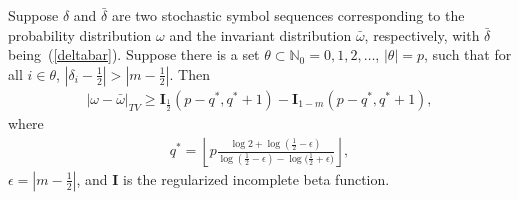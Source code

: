 \documentclass[final]{siamltex}
\begin{document}
\begin{theorem}
  \label{theoremlb} Suppose $\delta$ and $\bar{\delta}$ are two
  stochastic symbol sequences corresponding to the probability
  distribution $\omega$ and the invariant distribution $\bar{\omega}$,
  respectively, with $\bar{\delta}$ being~(\ref{deltabar}). Suppose
  there is a set $\theta \subset \mathbb{N}_0 = {0,1,2,\ldots}$,
  $|\theta|=p$, such that for all $i \in \theta$,
  $|\delta_i-\frac{1}{2}|>|m-\frac{1}{2}|$. Then
  \begin{align}
    \label{lbineq}
    |\omega-\bar{\omega}|_{TV} \ge
    \mathbf{I}_{\frac{1}{2}}(p-q^*,q^*+1) -
    \mathbf{I}_{1-m}(p-q^*,q^*+1),
  \end{align}
  where
  \begin{align}
    \label{kstar}
    q^* = \left\lfloor p \frac{\log{2}+\log{(\frac{1}{2}-\epsilon)}
      }{\log{(\frac{1}{2}-\epsilon)}-\log{(\frac{1}{2}+\epsilon})}
    \right\rfloor,
  \end{align}
  $\epsilon = |m-\frac{1}{2}|$, and $\mathbf{I}$ is the regularized
  incomplete beta function.
\end{theorem}
\end{document}
